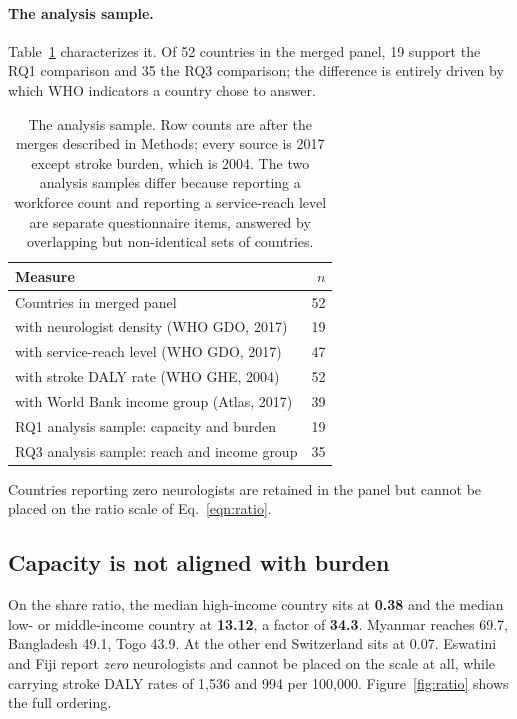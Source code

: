 \documentclass[10pt]{article}
\newcommand{\addtabletext}[1]{\par\vspace{4pt}\footnotesize #1\par}
\begin{document}
\paragraph{The analysis sample.} Table~\ref{tab:sample} characterizes it. Of 52
countries in the merged panel, 19 support the RQ1 comparison and 35 the RQ3
comparison; the difference is entirely driven by which WHO indicators a country
chose to answer.

\begin{table}[t!]
\centering
\caption{The analysis sample. Row counts are after the merges described in
Methods; every source is 2017 except stroke burden, which is 2004. The two
analysis samples differ because reporting a workforce count and reporting a
service-reach level are separate questionnaire items, answered by overlapping
but non-identical sets of countries.}
\label{tab:sample}
\begin{tabular}{lr}
\toprule
Measure & $n$ \\
\midrule
Countries in merged panel & 52 \\
\quad with neurologist density (WHO GDO, 2017) & 19 \\
\quad with service-reach level (WHO GDO, 2017) & 47 \\
\quad with stroke DALY rate (WHO GHE, 2004) & 52 \\
\quad with World Bank income group (Atlas, 2017) & 39 \\
\midrule
RQ1 analysis sample: capacity and burden & 19 \\
RQ3 analysis sample: reach and income group & 35 \\
\bottomrule
\end{tabular}

\addtabletext{Countries reporting zero neurologists are retained in the panel but
cannot be placed on the ratio scale of Eq.~\ref{eqn:ratio}.}
\end{table}

\subsection*{Capacity is not aligned with burden}

On the share ratio, the median high-income country sits at \textbf{0.38} and the
median low- or middle-income country at \textbf{13.12}, a factor of
\textbf{34.3}. Myanmar reaches 69.7, Bangladesh 49.1, Togo 43.9. At the other
end Switzerland sits at 0.07. Eswatini and Fiji report \emph{zero} neurologists
and cannot be placed on the scale at all, while carrying stroke DALY rates of
1{,}536 and 994 per 100{,}000. Figure~\ref{fig:ratio} shows the full ordering.
\end{document}

